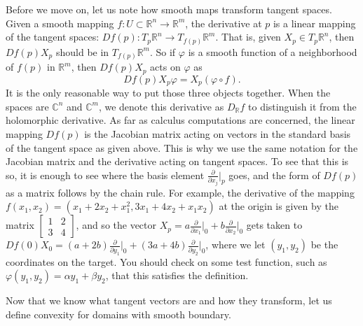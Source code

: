 \documentclass[12pt,openany]{book}
\newcommand{\C}{{\mathbb{C}}}
\newcommand{\R}{{\mathbb{R}}}
\theoremstyle{plain}
\theoremstyle{remark}
\theoremstyle{definition}
\theoremstyle{exercise}
\theoremstyle{example}
\begin{document}
Before we move on, let us note how smooth maps transform tangent spaces.
Given a smooth mapping 
$f \colon U \subset \R^n \to \R^m$,
the derivative at $p$ is a linear mapping of
the tangent spaces: $Df(p) \colon T_p \R^n \to T_{f(p)} \R^m$.
That is, given $X_p \in T_p \R^n$, then 
$Df(p) X_p$ should be in $T_{f(p)} \R^m$.
So if $\varphi$ is a smooth function of a neighborhood
of $f(p)$ in $\R^m$, then
$Df(p) X_p$ acts on $\varphi$ as
%
\begin{equation*}
Df(p) X_p \varphi = X_p (\varphi \circ f) .
\end{equation*}
It is the only reasonable way to put those three objects together.
When the spaces are $\C^n$ and $\C^m$, we denote this
derivative as
%
$D_\R f$
to distinguish it from the holomorphic derivative.
As far as calculus computations are concerned,
the linear mapping $Df(p)$ is
the Jacobian matrix acting on vectors in the standard basis of the tangent space
as given above.  This is why we use the same notation for the Jacobian
matrix and the derivative acting on tangent spaces.
To see that this is so, it is enough to see where the basis element
$\frac{\partial}{\partial x_j}\big|_p$ goes, and the form of $Df(p)$
as a matrix
follows by the chain rule.
For example, the derivative of the mapping $f(x_1,x_2) =
(x_1+2x_2+x_1^2,3x_1+4x_2+x_1x_2)$ at the origin is given by the matrix
$\left[ \begin{smallmatrix} 1 & 2 \\ 3 & 4 \end{smallmatrix} \right]$,
and so the vector
$X_p = a\frac{\partial}{\partial x_1}\big|_0
+
b\frac{\partial}{\partial x_2}\big|_0$
gets taken to
$Df(0) X_0 = (a+2b)\frac{\partial}{\partial y_1}\big|_0
+
(3a+4b)\frac{\partial}{\partial y_2}\big|_0$, where we let $(y_1,y_2)$ be the
coordinates on the target.  You should check on some test
function, such as
$\varphi(y_1,y_2) = \alpha y_1 + \beta y_2$, that this satisfies the
definition.


\medskip

Now that we know what tangent vectors are and how they transform,
let us define convexity
for domains with smooth boundary.
\end{document}
